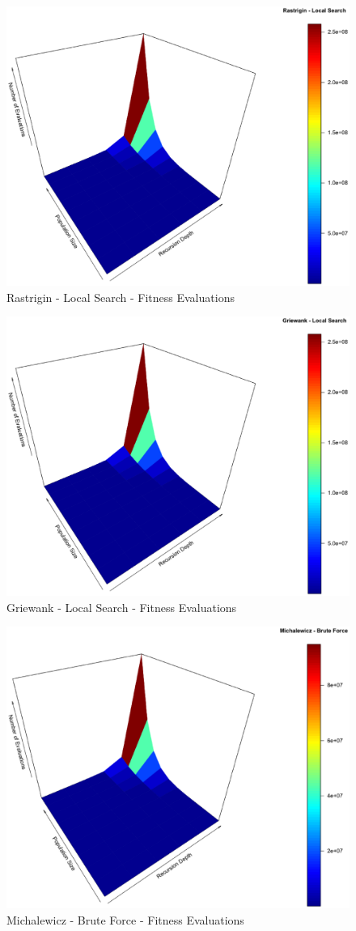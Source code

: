 \documentclass[conference]{IEEEtran}
\begin{document}
\begin{figure}[tbp]
\centering
\includegraphics[width=1.0\hsize,height=0.65\hsize]{fig13.eps}
\caption{Rastrigin - Local Search - Fitness Evaluations}
\label{fig24}
\end{figure}

\begin{figure}[tbp]
\centering
\includegraphics[width=1.0\hsize,height=0.65\hsize]{fig16.eps}
\caption{Griewank - Local Search - Fitness Evaluations}
\label{fig25}
\end{figure}

\begin{figure}[tbp]
\centering
\includegraphics[width=1.0\hsize,height=0.65\hsize]{fig19.eps}
\caption{Michalewicz - Brute Force - Fitness Evaluations}
\label{fig26}
\end{figure}
\end{document}

